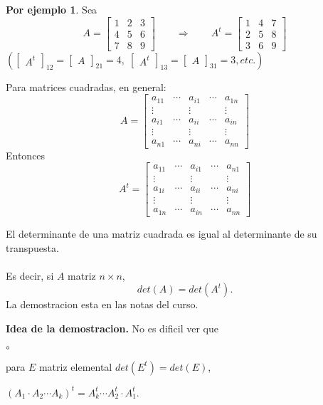 \documentclass{article}
\theoremstyle{definition}
\theoremstyle{definition}
\newtheorem*{ej}{Por ejemplo}
\theoremstyle{remark}
\begin{document}
\begin{ej}
  Sea \[
A=\begin{bmatrix}1 & 2 & 3 \\ 4 & 5 & 6 \\ 7 & 8 & 9 \end{bmatrix} \quad \quad \Rightarrow \quad \quad A^t = \begin{bmatrix}1 & 4 & 7 \\ 2 & 5 & 8 \\ 3 & 6 & 9 \end{bmatrix}
  \]
  $\left(\begin{bmatrix}A^t\end{bmatrix}_{12}=\begin{bmatrix}A\end{bmatrix}_{21}=4,\; \begin{bmatrix}A^t\end{bmatrix}_{13}=\begin{bmatrix}A\end{bmatrix}_{31}=3,etc.\right)$
\end{ej}
Para matrices cuadradas, en general: \[
A=\begin{bmatrix}a_{11} & \cdots & a_{i1} & \cdots & a_{1n} \\ 
\vdots & & \vdots && \vdots \\ a_{i1} & \cdots & a_{ii} & \cdots & a_{in} \\
\vdots & & \vdots && \vdots \\ a_{n1}&  \cdots & a_{ni} & \cdots & a_{nn} \end{bmatrix}
\]
Entonces \[
A^t=\begin{bmatrix} 
a_{11} & \cdots & a_{i1} & \cdots & a_{n1} \\
\vdots && \vdots && \vdots \\
a_{1i} & \cdots & a_{ii} & \cdots & a_{ni} \\
\vdots && \vdots && \vdots \\
a_{1n} & \cdots & a_{in} & \cdots & a_{nn}
\end{bmatrix}
\]
\begin{teo}
  El determinante de una matriz cuadrada es igual al determinante de su transpuesta. \\\\
  Es decir, si $A$ matriz $n \times n$, \[
det(A)=det(A^t).
  \]
  La demostracion esta en las notas del curso. 
\end{teo}
\textbf{Idea de la demostracion.} No es dificil ver que \begin{list}{$\circ$}{}  
\item para $E$ matriz elemental $det(E^t)=det(E)$, 
\item $(A_1 \cdot A_2 \cdots A_k)^t = A^t_k \cdots A^t_2 \cdot A^t_1 $.
\end{list}
\end{document}
